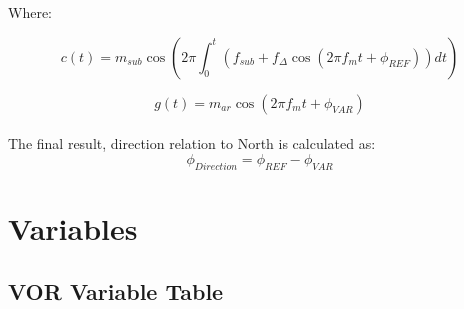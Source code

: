 \documentclass[12pt]{article}
\begin{document}
Where:

\begin{equation}\label{c(t)}
c(t) = m_{sub} \cos (2 \pi \int_{0}^{t}\left(f_{sub} + f_\Delta \cos(2 \pi f_m t + \phi_{REF})\right)dt) 
\end{equation}

\begin{equation}
\label{g(t)}
g(t) = m_{ar} \cos (2 \pi f_m t + \phi_{VAR})
\end{equation} %
\\
The final result, direction relation to North is calculated as:
\begin{equation}
\label{phase compare}
\phi_{Direction} = \phi_{REF}-\phi_{VAR}
\end{equation}

\newpage
\section{Variables} %

\subsection{VOR Variable Table}
\end{document}
